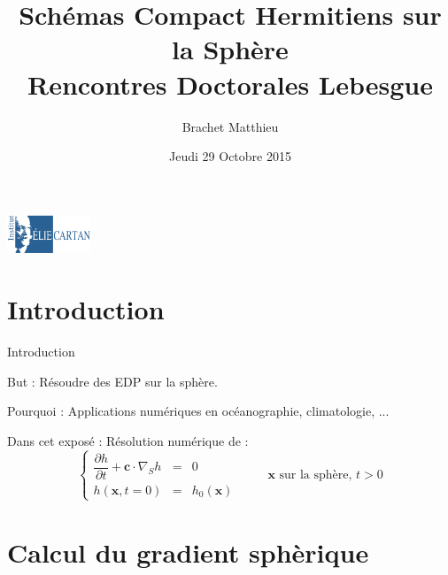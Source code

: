 \documentclass[11pt]{beamer}
\title[Résolution numérique d'EDP sur $\mathbb{S}^2$]{Schémas Compact Hermitiens sur la Sphère\\
Rencontres Doctorales Lebesgue}
\author{Brachet Matthieu}
\date[29.10.2015]{Jeudi 29 Octobre 2015}
\institute[IECL]{Institut Elie Cartan de Lorraine}
\begin{document}
\begin{frame}
\titlepage
\begin{center}
\includegraphics[width=2.5cm]{IECL.jpg}
\end{center}
\end{frame}

\section{Introduction}
\begin{frame}{Introduction}

\begin{exampleblock}{But :}
Résoudre des EDP sur la sphère.
\end{exampleblock}

\begin{exampleblock}{Pourquoi :}
Applications numériques en océanographie, climatologie, ...
\end{exampleblock}

\begin{block}{Dans cet exposé :}
Résolution numérique de :
$$\left\{
\begin{array}{rcl}
\dfrac{\partial h}{\partial t} + \mathbf{c} \cdot \nabla_S h & = & 0 \\
h(\mathbf{x},t=0) & = & h_0 ( \mathbf{x} )
\end{array}
\right. \hspace{1cm} \mathbf{x} \text{ sur la sphère, } t>0$$
\end{block}
\end{frame}

\begin{frame}
\tableofcontents
\end{frame}


\section{Calcul du gradient sphèrique}
\end{document}
